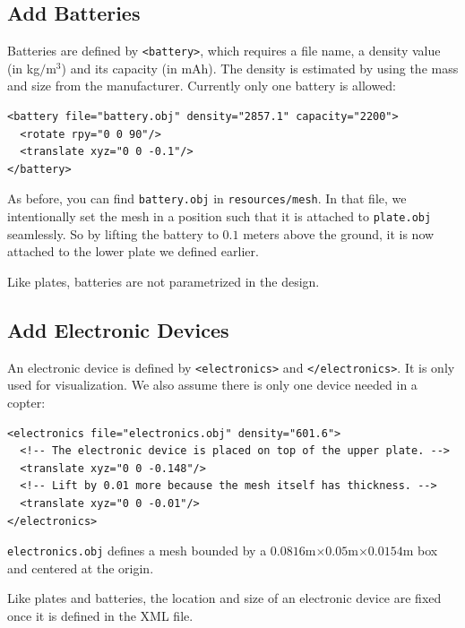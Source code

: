 \subsection{Add Batteries}
Batteries are defined by \texttt{<battery>}, which requires a file name, a density value (in kg$/$m$^3$) and its capacity (in mAh). The density is estimated by using the mass and size from the manufacturer. Currently only one battery is allowed:
\begin{verbatim}
<battery file="battery.obj" density="2857.1" capacity="2200">
  <rotate rpy="0 0 90"/>
  <translate xyz="0 0 -0.1"/>
</battery>
\end{verbatim}
As before, you can find \texttt{battery.obj} in \texttt{resources/mesh}. In that file, we intentionally set the mesh in a position such that it is attached to \texttt{plate.obj} seamlessly. So by lifting the battery to $0.1$ meters above the ground, it is now attached to the lower plate we defined earlier.

Like plates, batteries are not parametrized in the design.

\subsection{Add Electronic Devices}
An electronic device is defined by \texttt{<electronics>} and \texttt{</electronics>}. It is only used for visualization. We also assume there is only one device needed in a copter:
\begin{verbatim}
<electronics file="electronics.obj" density="601.6">
  <!-- The electronic device is placed on top of the upper plate. -->
  <translate xyz="0 0 -0.148"/>
  <!-- Lift by 0.01 more because the mesh itself has thickness. -->
  <translate xyz="0 0 -0.01"/>
</electronics>
\end{verbatim}
\texttt{electronics.obj} defines a mesh bounded by a $0.0816$m$\times0.05$m$\times0.0154$m box and centered at the origin.

Like plates and batteries, the location and size of an electronic device are fixed once it is defined in the XML file.

